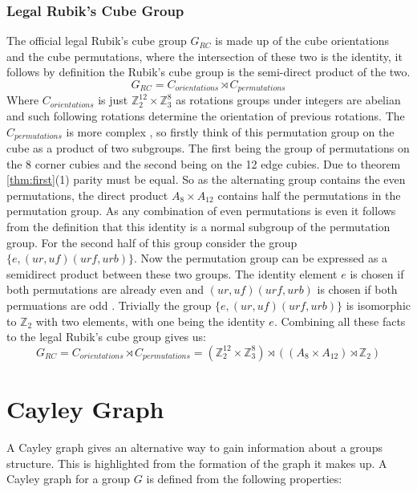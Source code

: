 \documentclass{article}
\newcounter{theo}[section]\setcounter{theo}{0}
\newcounter{prop}[section]\setcounter{prop}{0}
\newcounter{lem}[section]\setcounter{lem}{0}
\begin{document}
\subsubsection{Legal Rubik's Cube Group}

The official legal Rubik's cube group $G_{RC}$ is made up of the cube orientations and the cube permutations, where the intersection of these two is the identity, it follows by definition the Rubik's cube group is the semi-direct product of the two. 
\begin{equation}
G_{RC} = C_{orientations} \rtimes C_{permutations}
\end{equation}
Where $C_{orientations}$ is just $\mathbb{Z}_{2}^{12} \times \mathbb{Z}_{3}^{8}$ as rotations groups under integers are abelian and such following rotations determine the orientation of previous rotations. 
The $C_{permutations}$ is more complex , so firstly think of this permutation group on the cube as a product of two subgroups. The first being the group of permutations on the 8 corner cubies and the second being on the 12 edge cubies. Due to theorem \ref{thm:first}(1) parity must be equal. So as the alternating group contains the even permutations, the direct product $A_8 \times A_{12}$ contains half the permutations in the permutation group. As any combination of even permutations is even it follows from the definition that this identity is a normal subgroup of the permutation group.
For the second half of this group consider the group $\{e,(ur,uf)(urf,urb)\}$. Now the permutation group can be expressed as a semidirect product between these two groups. The identity element $e$ is chosen if both permutations are already even and $(ur,uf)(urf,urb)$ is chosen if both permuations are odd \cite{Final}. Trivially the group $\{e,(ur,uf)(urf,urb)\}$ is isomorphic to $\mathbb{Z}_2$ with two elements, with one being the identity $e$. Combining all these facts to the legal Rubik's cube group gives us: 
\begin{equation}
G_{RC} = C_{orientations} \rtimes C_{permutations} = (\mathbb{Z}_{2}^{12} \times \mathbb{Z}_{3}^{8}) \rtimes ((A_8 \times A_{12})\rtimes \mathbb{Z}_2)
\end{equation} 
\newpage
\section{Cayley Graph}
A Cayley graph gives an alternative way to gain information about a groups structure. This is highlighted from the formation of the graph it makes up. A Cayley graph for a group $G$ is defined from the following properties:
\end{document}
